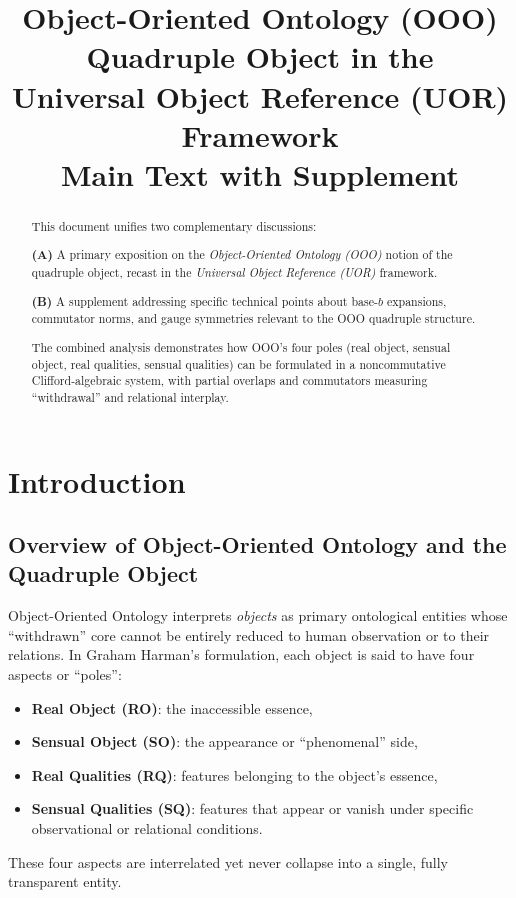 \documentclass[11pt]{article}
\begin{document}

\title{\textbf{Object-Oriented Ontology (OOO) Quadruple Object in the \\
Universal Object Reference (UOR) Framework}\\[5pt]
\large Main Text with Supplement}
\author{}
\date{}
\maketitle

\begin{abstract}
This document unifies two complementary discussions:

\textbf{(A)} A primary exposition on the \emph{Object-Oriented Ontology (OOO)} notion of the 
quadruple object, recast in the \emph{Universal Object Reference (UOR)} framework.

\textbf{(B)} A supplement addressing specific technical points about base-\(b\) expansions, 
commutator norms, and gauge symmetries relevant to the OOO quadruple structure.

The combined analysis demonstrates how OOO's four poles 
(real object, sensual object, real qualities, sensual qualities) 
can be formulated in a noncommutative Clifford-algebraic system, 
with partial overlaps and commutators measuring “withdrawal” 
and relational interplay.
\end{abstract}

\tableofcontents


\section{Introduction}
\label{sec:intro}

\subsection{Overview of Object-Oriented Ontology and the Quadruple Object}
Object-Oriented Ontology interprets \emph{objects} as primary ontological entities 
whose “withdrawn” core cannot be entirely reduced to human observation or 
to their relations. In Graham Harman's formulation, each object is said to have 
four aspects or “poles”:
\begin{itemize}[itemsep=0pt]
\item \textbf{Real Object (RO)}: the inaccessible essence,
\item \textbf{Sensual Object (SO)}: the appearance or “phenomenal” side,
\item \textbf{Real Qualities (RQ)}: features belonging to the object’s essence,
\item \textbf{Sensual Qualities (SQ)}: features that appear or vanish 
      under specific observational or relational conditions.
\end{itemize}
These four aspects are interrelated yet never collapse into a single, 
fully transparent entity.
\end{document}
